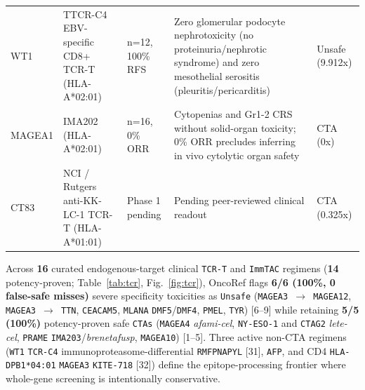 \documentclass[10pt,letterpaper]{article}
\begin{document}
\begin{table}[htbp]
\begin{tabularx}{\textwidth}{p{2.5cm} p{2.9cm} p{2.2cm} X p{2.5cm}}
WT1 & TTCR-C4 EBV-specific CD8+ TCR-T (HLA-A*02:01) & n=12, 100\% RFS & Zero glomerular podocyte nephrotoxicity (no proteinuria/nephrotic syndrome) and zero mesothelial serositis (pleuritis/pericarditis) & Unsafe (9.912x) \\
MAGEA1 & IMA202 (HLA-A*02:01) & n=16, 0\% ORR & Cytopenias and Gr1-2 CRS without solid-organ toxicity; 0\% ORR precludes inferring in vivo cytolytic organ safety & CTA (0x) \\
CT83 & NCI / Rutgers anti-KK-LC-1 TCR-T (HLA-A*01:01) & Phase 1 pending & Pending peer-reviewed clinical readout & CTA (0.325x) \\
\bottomrule
\end{tabularx}
\end{table}
Across \textbf{16} curated endogenous-target clinical \texttt{TCR-T} and \texttt{ImmTAC} regimens (\textbf{14} potency-proven; Table~\ref{tab:tcr}, Fig.~\ref{fig:tcr}), OncoRef flags \textbf{6/6 (100\%, 0 false-safe misses)} severe specificity toxicities as \texttt{Unsafe} (\texttt{MAGEA3 $\rightarrow$ MAGEA12}, \texttt{MAGEA3 $\rightarrow$ TTN}, \texttt{CEACAM5}, \texttt{MLANA} \texttt{DMF5}/\texttt{DMF4}, \texttt{PMEL}, \texttt{TYR}) [6--9] while retaining \textbf{5/5 (100\%)} potency-proven safe \texttt{CTAs} (\texttt{MAGEA4} \emph{afami-cel}, \texttt{NY-ESO-1} and \texttt{CTAG2} \emph{lete-cel}, \texttt{PRAME} \texttt{IMA203}/\emph{brenetafusp}, \texttt{MAGEA10}) [1--5]. Three active non-CTA regimens (\texttt{WT1} \texttt{TCR-C4} immunoproteasome-differential \texttt{RMFPNAPYL} [31], \texttt{AFP}, and CD4 \texttt{HLA-DPB1*04:01} \texttt{MAGEA3} \texttt{KITE-718} [32]) define the epitope-processing frontier where whole-gene screening is intentionally conservative.
\end{document}
